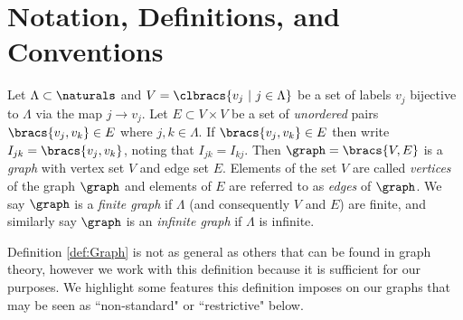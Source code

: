 \section{Notation, Definitions, and Conventions} \label{sec:QG-Notation}
\begin{definition}[Graph] \label{def:Graph}
	Let $\Lambda\subset\naturals$ and $V=\clbracs{v_j \ \vert \ j\in\Lambda}$ be a set of labels $v_j$ bijective to $\Lambda$ via the map $j\rightarrow v_j$.
	Let $E\subset V\times V$ be a set of \textit{unordered} pairs $\bracs{v_j,v_k}\in E$ where $j,k\in\Lambda$.
	If $\bracs{v_j,v_k}\in E$ then write $I_{jk} = \bracs{v_j,v_k}$, noting that $I_{jk}=I_{kj}$.
	Then $\graph=\bracs{V,E}$ is a \textit{graph} with vertex set $V$ and edge set $E$.
	Elements of the set $V$ are called \textit{vertices} of the graph $\graph$ and elements of $E$ are referred to as \textit{edges} of $\graph$. \newline
	We say $\graph$ is a \textit{finite graph} if $\Lambda$ (and consequently $V$ and $E$) are finite, and similarly say $\graph$ is an \textit{infinite graph} if $\Lambda$ is infinite.
\end{definition}
Definition \ref{def:Graph} is not as general as others that can be found in graph theory, however we work with this definition because it is sufficient for our purposes.
We highlight some features this definition imposes on our graphs that may be seen as ``non-standard" or ``restrictive" below.
